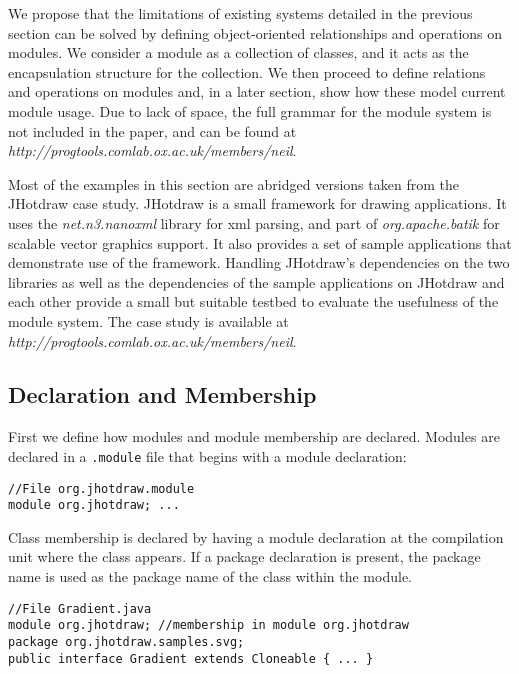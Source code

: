 
We propose that the limitations of existing systems detailed in the previous section
can be solved by defining object-oriented relationships and operations on modules. 
We consider a module as a collection of classes, and it acts as the encapsulation
structure for the collection. We then proceed to define
relations and operations on modules and, in a later section, show how
these model current module usage. Due to lack of space, the full grammar for
the module system is not included in the paper, and can be found at
\textit{http://progtools.comlab.ox.ac.uk/members/neil}.

Most of the examples in this section are abridged versions taken from the JHotdraw case study. 
JHotdraw\cite{jhotdraw} is a small framework for drawing applications. It
uses the \textit{net.n3.nanoxml} library for xml parsing, and part of 
\textit{org.apache.batik} for scalable vector graphics support. It also
provides a set of sample applications that demonstrate use of the framework.
Handling JHotdraw's dependencies on the two libraries as well as the dependencies
of the sample applications on JHotdraw and each other provide a small but
suitable testbed to evaluate the usefulness of the module system.
The case study is available at \textit{http://progtools.comlab.ox.ac.uk/members/neil}. 

\subsection{Declaration and Membership}

First we define how modules and module membership are declared. 
Modules are declared in a {\tt .module} file that begins with a module
declaration:

\begin{lstlisting}
//File org.jhotdraw.module
module org.jhotdraw; ...
\end{lstlisting}

Class membership is declared by having a module declaration at the compilation unit where 
the class appears.  If a package declaration is present, 
the package name is used as the package name of the class within the module.

\begin{lstlisting}
//File Gradient.java
module org.jhotdraw; //membership in module org.jhotdraw
package org.jhotdraw.samples.svg;
public interface Gradient extends Cloneable { ... }
\end{lstlisting}

